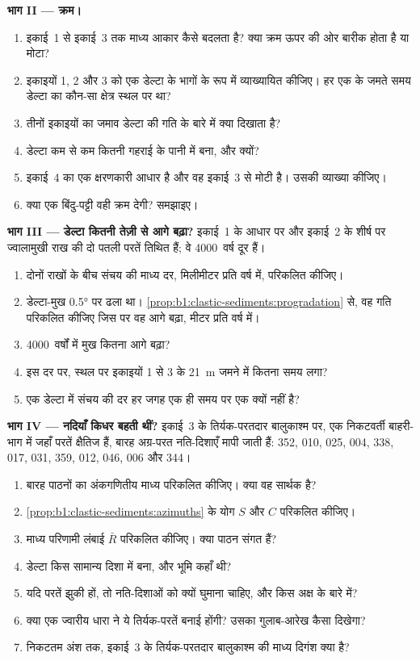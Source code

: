 \begin{problem}
\medskip
\noindent\textbf{भाग II --- क्रम।}
\begin{enumerate}[resume]
  \item इकाई~1 से इकाई~3 तक माध्य आकार कैसे बदलता है? क्या क्रम ऊपर की ओर बारीक होता है या मोटा?
  \item इकाइयों 1, 2 और 3 को एक डेल्टा के भागों के रूप में व्याख्यायित कीजिए। हर एक के जमते समय डेल्टा का कौन-सा क्षेत्र स्थल पर था?
  \item तीनों इकाइयों का जमाव डेल्टा की गति के बारे में क्या दिखाता है?
  \item डेल्टा कम से कम कितनी गहराई के पानी में बना, और क्यों?
  \item इकाई~4 का एक क्षरणकारी आधार है और वह इकाई~3 से मोटी है। उसकी व्याख्या कीजिए।
  \item क्या एक बिंदु-पट्टी वही क्रम देगी? समझाइए।
\end{enumerate}

\medskip
\noindent\textbf{भाग III --- डेल्टा कितनी तेज़ी से आगे बढ़ा?}
इकाई~1 के आधार पर और इकाई~2 के शीर्ष पर ज्वालामुखी राख की दो पतली परतें तिथित हैं; वे \num{4000}~वर्ष दूर हैं।
\begin{enumerate}[resume]
  \item दोनों राखों के बीच संचय की माध्य दर, मिलीमीटर प्रति वर्ष में, परिकलित कीजिए।
  \item डेल्टा-मुख \ang{0.5} पर ढला था। \cref{prop:b1:clastic-sediments:progradation} से, वह गति परिकलित कीजिए जिस पर वह आगे बढ़ा, मीटर प्रति वर्ष में।
  \item \num{4000}~वर्षों में मुख कितना आगे बढ़ा?
  \item इस दर पर, स्थल पर इकाइयों 1 से 3 के \qty{21}{m} जमने में कितना समय लगा?
  \item एक डेल्टा में संचय की दर हर जगह एक ही समय पर एक क्यों नहीं है?
\end{enumerate}

\medskip
\noindent\textbf{भाग IV --- नदियाँ किधर बहती थीं?}
इकाई~3 के तिर्यक-परतदार बालुकाश्म पर, एक निकटवर्ती बाहरी-भाग में जहाँ परतें क्षैतिज हैं, बारह अग्र-परत नति-दिशाएँ मापी जाती हैं: 352, 010, 025, 004, 338, 017, 031, 359, 012, 046, 006 और 344।
\begin{enumerate}[resume]
  \item बारह पाठनों का अंकगणितीय माध्य परिकलित कीजिए। क्या वह सार्थक है?
  \item \cref{prop:b1:clastic-sediments:azimuths} के योग $S$ और $C$ परिकलित कीजिए।
  \item माध्य परिणामी लंबाई $\bar R$ परिकलित कीजिए। क्या पाठन संगत हैं?
  \item डेल्टा किस सामान्य दिशा में बना, और भूमि कहाँ थी?
  \item यदि परतें झुकी हों, तो नति-दिशाओं को क्यों घुमाना चाहिए, और किस अक्ष के बारे में?
  \item क्या एक ज्वारीय धारा ने ये तिर्यक-परतें बनाई होंगी? उसका गुलाब-आरेख कैसा दिखेगा?
  \item निकटतम अंश तक, इकाई~3 के तिर्यक-परतदार बालुकाश्म की माध्य  दिगंश क्या है?
\end{enumerate}
\end{problem}
